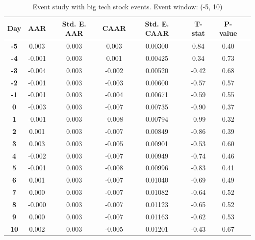 \begin{table}[h]
    \centering
    \caption{Event study with big tech stock events. Event window: (-5, 10)}
    \label{tab:esBigTech}
    \begin{tabular}{|c|c|c|c|c|c|c|c|}
        \hline
        \textbf{Day} & \textbf{AAR} & \textbf{Std. E. AAR} & \textbf{CAAR} & \textbf{Std. E. CAAR} & \textbf{T-stat} & \textbf{P-value} \\
        \hline
        \textbf{-5} & 0.003 & 0.003 & 0.003 & 0.00300 & 0.84 & 0.40 \\
        \hline
        \textbf{-4} & -0.001 & 0.003 & 0.001 & 0.00425 & 0.34 &  0.73 \\
        \hline
        \textbf{-3} & -0.004 & 0.003 & -0.002 & 0.00520 & -0.42 & 0.68 \\
        \hline
        \textbf{-2} & -0.001 & 0.003 & -0.003 & 0.00600 & -0.57 & 0.57 \\
        \hline
        \textbf{-1} & -0.001 & 0.003 & -0.004 &  0.00671 & -0.59 & 0.55 \\
        \hline
        \textbf{0} & -0.003 & 0.003 & -0.007 & 0.00735 & -0.90 & 0.37 \\
        \hline
        \textbf{1} & -0.001 & 0.003 & -0.008 & 0.00794 & -0.99 & 0.32 \\
        \hline
        \textbf{2} & 0.001 & 0.003 & -0.007 & 0.00849 & -0.86 &  0.39 \\
        \hline
        \textbf{3} & 0.003 & 0.003 & -0.005 & 0.00901 & -0.53 & 0.60 \\
        \hline
        \textbf{4} & -0.002 & 0.003 & -0.007 & 0.00949 & -0.74 & 0.46 \\
        \hline
        \textbf{5} & -0.001 &  0.003 & -0.008 & 0.00996 & -0.83 &  0.41 \\
        \hline
        \textbf{6} & 0.001 & 0.003 & -0.007 &  0.01040 & -0.69 & 0.49 \\
        \hline
        \textbf{7} & 0.000 & 0.003 & -0.007 & 0.01082 & -0.64 & 0.52 \\
        \hline
        \textbf{8} & -0.000 &  0.003 & -0.007 & 0.01123 & -0.65 &  0.52 \\
        \hline
        \textbf{9} & 0.000 & 0.003 & -0.007 &  0.01163 & -0.62 & 0.53 \\
        \hline
        \textbf{10} & 0.002 & 0.003 & -0.005 & 0.01201 & -0.43 & 0.67 \\
        \hline
    \end{tabular}
\end{table}


